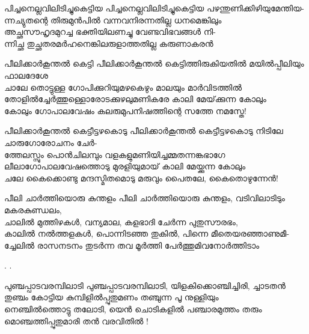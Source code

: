 \begin{enumerate}
\begin{slokam}{\VKm}{\VKG}{പിച്ചനെല്ലവിലിടിച്ചുകെട്ടിയ}
പിച്ചനെല്ലവിലിടിച്ചുകെട്ടിയ പഴന്തുണിക്കിഴിയുമേന്തിയ-\\
ന്നച്യുതന്റെ തിരുമുൻപിൽ വന്നവനിരന്നതില്ല ധനമെങ്കിലും\\
അച്ഛസൗഹൃദമുറച്ച ഭക്തിയിലണച്ചു വേണ്ടവിഭവങ്ങള്‍ നി-\\
ന്നിച്ഛ തുച്ഛതരമർഹനെങ്കിലരുളാത്തതില്ല കരുണാകരൻ
\end{slokam}


\begin{slokam}{\VSr}{\GRT}{പീലിക്കാർകൂന്തൽ കെട്ടി}
 പീലിക്കാർകൂന്തൽ കെട്ടിത്തിരുകിയതിൽ മയിൽപ്പീലിയും ഫാലദേശേ\\
ചാലേ തൊട്ടുള്ള ഗോപിക്കുറിയുമഴകെഴും മാലയും മാർവിടത്തിൽ\\
തോളിൽച്ചേർത്തുള്ളൊരോടക്കുഴലുമണികരേ കാലി മേയ്‌ക്കുന്ന കോലും\\
കോലും ഗോപാലവേഷം കലരുമുപനിഷത്തിന്റെ സത്തേ നമസ്തേ!
\end{slokam}


\begin{slokam}{\VSr}{\Poonth}{പീലിക്കാർകൂന്തൽ കെട്ടീട്ടഴകൊടു}
പീലിക്കാർകൂന്തൽ കെട്ടീട്ടഴകൊടു നിടിലേ ചാരുഗോരോചനം ചേർ-\\
ത്തേലസ്സും പൊൻചിലമ്പും വളകളുമണിയിച്ചമ്മതന്നങ്കഭാഗേ\\
ലീലാഗോപാലവേഷത്തൊടു മുരളിയുമായ്‌ കാലി മേയ്ക്കുന്ന കോലും\\
ചലേ കൈക്കൊണ്ടു മന്ദസ്മിതമൊടു മരുവും പൈതലേ, കൈതൊഴുന്നേൻ!
\end{slokam}




\begin{slokam}{\VKm}{\CVVB}{പീലി ചാർത്തിയൊരു കുന്തളം}
പീലി ചാർത്തിയൊരു കുന്തളം, വടിവിലാടിടും മകരകുണ്ഡലം,\\
ചാലിൽ മുത്തിഴകള്‍, വന്യമാല, കളഭാദി ചേർന്ന പുതുസൗരഭം,\\
കാലിൽ നൽത്തളകള്‍, പൊന്നിടഞ്ഞ തുകിൽ, പിന്നെ മീതെയരഞ്ഞാണുമീ-\\
ച്ചേലിൽ രാസനടനം തുടർന്ന തവ മൂർത്തി പേർത്തുമിവനോർത്തിടാം
\end{slokam}



.
.


\begin{slokam}{\VSv}{\RV}{പുഞ്ചപ്പാടവരമ്പിലാടി}
പുഞ്ചപ്പാടവരമ്പിലാടി, യിളകിക്കൊഞ്ചിച്ചിരി, ച്ചാടതൻ\\
തുഞ്ചം കോട്ടിയ കുമ്പിളിൽപ്പുതുമണം തഞ്ചുന്ന പൂ നുള്ളിയും\\
നെഞ്ചിൽത്തൊട്ടു തലോടി, യെൻ ചൊടികളിൽ പഞ്ചാരമുത്തം തരും\\
മൊഞ്ചത്തിപ്പുതുമാരി തൻ വരവിതിൽ !
\end{slokam}


\end{enumerate}
